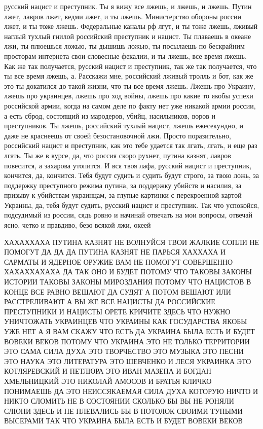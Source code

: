 русский нацист и преступник. Ты я вижу все лжешь, и лжешь, и лжешь. Путин лжет,
лавров лжет, кедми лжет, и ты лжешь. Министерство обороны россии лжет, и ты
тоже лжешь.  Федеральные каналы рф лгут, и ты тоже лжешь, лживый наглый тухлый
гнилой российский преступник и нацист. Ты плаваешь в океане лжи, ты плюешься
ложью, ты дышишь ложью, ты посылаешь по бескрайним просторам интернета свои
словесные фекалии, и ты лжешь, все время лжешь.  Как же так получается, русский
нацист и преступник, так же так получается, что ты все время лжешь, а.
Расскажи мне, российский лживый тролль и бот, как же это ты докатился до такой
жизни, что ты все время лжешь. Лжешь про Украину, лжешь про украинцев, лжешь
про ход войны, лжешь про какие то якобы успехи российской армии, когда на самом
деле по факту нет уже никакой армии россии, а есть сброд, состоящий из
мародеров, убийц, насильников, воров и преступников. Ты лжешь, российский
тухлый нацист, лжешь ежесекундно, и даже не краснеешь от своей безостановочной
лжи. Просто поразительно, российский нацист и преступник, как это тебе удается
так лгать, лгать, и еще раз лгать. Ты же в курсе, да, что россия скоро рухнет,
путина казнят, лавров повесится, а захарова утопится. И вся твоя лафа, русский
нацист и преступник, кончится, да, кончится. Тебя будут судить и судить будут
строго, за твою ложь, за поддержку преступного режима путина, за поддержку
убийств и насилия, за призыву к убийствам украинцам, за глупые картинки с
перекроенной картой Украины, да, тебя будут судить, русский нацист и
преступник. Так что успокойся, подсудимый из россии, сядь ровно и начинай
отвечать на мои вопросы, отвечай ясно, четко и правдиво, безо всякой лжи,
океей

ХАХАХХАХА ПУТИНА КАЗНЯТ НЕ ВОЛНУЙСЯ ТВОИ ЖАЛКИЕ СОПЛИ НЕ ПОМОГУТ ДА ДА ДА
ПУТИНА КАЗНЯТ НЕ ПАРЬСЯ ХАХХАХА И САРМАТЫ И ЯДЕРНОЕ ОРУЖИЕ ВАМ НЕ ПОМОГУТ
СОВЕРШЕННО ХАХАХХАХАХА ДА ТАК ОНО И БУДЕТ ПОТОМУ ЧТО ТАКОВЫ ЗАКОНЫ ИСТОРИИ
ТАКОВЫ ЗАКОНЫ МИРОЗДАНИЯ ПОТОМУ ЧТО НАЦИСТОВ В КОНЦЕ ВСЕ РАВНО ВЕШАЮТ ДА СУДЯТ
А ПОТОМ ВЕШАЮТ ИЛИ РАССТРЕЛИВАЮТ А ВЫ ЖЕ ВСЕ НАЦИСТЫ ДА РОССИЙСКИЕ ПРЕСТУПНИКИ
И НАЦИСТЫ ОРЕТЕ КРИЧИТЕ ЗДЕСЬ ЧТО НУЖНО УНИЧТОЖАТЬ УКРАИНЦЕВ ЧТО УКРАИНЫ КАК
ГОСУДАРСТВА ЯКОБЫ УЖЕ НЕТ А Я ВАМ СКАЖУ ЧТО ЕСТЬ ДА УКРАИНА БЫЛА ЕСТЬ И БУДЕТ
ВОВЕКИ ВЕКОВ ПОТОМУ ЧТО УКРАИНА ЭТО НЕ ТОЛЬКО ТЕРРИТОРИИ ЭТО САМА СИЛА ДУХА ЭТО
ТВОРЧЕСТВО ЭТО МУЗЫКА ЭТО ПЕСНИ ЭТО НАУКА ЭТО ЛИТЕРАТУРА ЭТО ШЕВЧЕНКО И ЛЕСЯ
УКРАИНКА ЭТО КОТЛЯРЕВСКИЙ И ПЕТЛЮРА ЭТО ИВАН МАЗЕПА И БОГДАН ХМЕЛЬНИЦКИЙ ЭТО
НИКОЛАЙ АМОСОВ И БРАТЬЯ КЛИЧКО ПОНИМАЕШЬ ДА ЭТО НЕИССЯКАЕМАЯ СИЛА ДУХА КОТОРУЮ
НИЧТО И НИКТО СЛОМИТЬ НЕ В СОСТОЯНИИ СКОЛЬКО БЫ ВЫ НЕ РОНЯЛИ СЛЮНИ ЗДЕСЬ И НЕ
ПЛЕВАЛИСЬ БЫ В ПОТОЛОК СВОИМИ ТУПЫМИ ВЫСЕРАМИ ТАК ЧТО УКРАИНА БЫЛА ЕСТЬ И БУДЕТ
ВОВЕКИ ВЕКОВ

